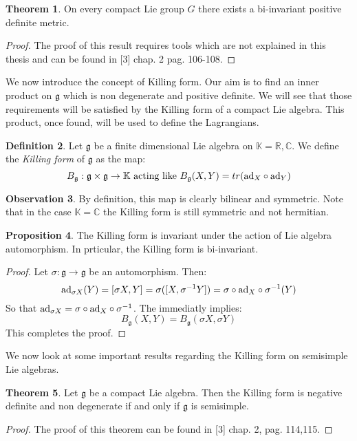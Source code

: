 \documentclass[12pt,a4paper]{report}
\theoremstyle{definition}
\newtheorem{Def}{Definition}[chapter]
\theoremstyle{Theorem}
\newtheorem{Theo}[Def]{Theorem}
\newtheorem{Prop}[Def]{Proposition}
\theoremstyle{definition}
\theoremstyle{definition}
\newtheorem{Obs}[Def]{Observation}
\begin{document}
	\begin{Theo} \label{Scal_prod_theo_1}
		On every compact Lie group $G$ there exists a bi-invariant positive definite metric.
	\end{Theo}
	\begin{proof}
		The proof of this result requires tools which are not explained in this thesis and can be found in [3] chap. 2 pag. 106-108.
	\end{proof}
	We now introduce the concept of Killing form. Our aim is to find an inner product on $\mathfrak{g}$ which is non degenerate and positive definite. We will see that those requirements will be satisfied by the Killing form of a compact Lie algebra. This product, once found, will be used to define the Lagrangians.
	\begin{Def}
		Let $\mathfrak{g}$ be a finite dimensional Lie algebra on $\mathbb{K}=\mathbb{R},\mathbb{C}$. We define the \textit{Killing form} of $\mathfrak{g}$ as the map:
		$$B_\mathfrak{g}:\mathfrak{g}\times \mathfrak{g}\rightarrow\mathbb{K}\hbox{ acting like } B_\mathfrak{g}(X,Y)=tr(\hbox{ad}_X\circ \hbox{ad}_Y)$$
	\end{Def}
	\begin{Obs}
		By definition, this map is clearly bilinear and symmetric. Note that in the case $\mathbb{K}=\mathbb{C}$ the Killing form is still symmetric and not hermitian.
	\end{Obs} 
	\begin{Prop}\label{Prop_2.8.2}
		The Killing form is invariant under the action of Lie algebra automorphism. In prticular, the Killing form is bi-invariant.
	\end{Prop}
	\begin{proof}
		Let $\sigma:\mathfrak{g}\rightarrow\mathfrak{g}$ be an automorphism. Then:
		$$\hbox{ad}_{\sigma X}(Y)=[\sigma X,Y]=\sigma([X,\sigma^{-1}Y])=\sigma\circ \hbox{ad}_X\circ \sigma^{-1}(Y)$$
		So that $\hbox{ad}_{\sigma X}=\sigma\circ \hbox{ad}_X\circ \sigma^{-1}$. The immediatly implies:
		$$B_\mathfrak{g}(X,Y)=B_\mathfrak{g}(\sigma X,\sigma Y)$$
		This completes the proof.
	\end{proof}
	We now look at some important results regarding the Killing form on semisimple Lie algebras.
	\begin{Theo}\label{Theo_2.8.2}
		Let $\mathfrak{g}$ be a compact Lie algebra. Then the Killing form is negative definite and non degenerate if and only if $\mathfrak{g}$ is semisimple.
	\end{Theo}
	\begin{proof}
		The proof of this theorem can be found in [3] chap. 2, pag. 114,115.
	\end{proof}
\end{document}

